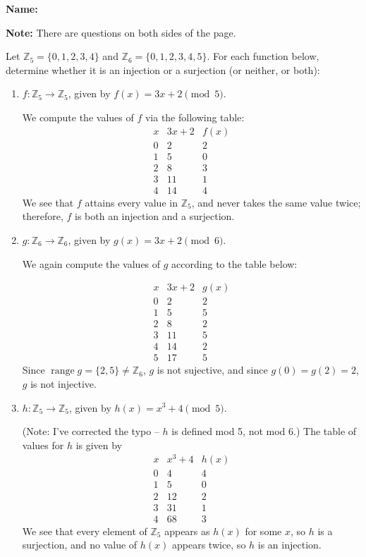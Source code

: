 \documentclass[12pt]{article}
\newcommand{\points}[1]{\marginpar{\hspace{24pt}[#1]}}
\newcommand{\Z}{\mathbb{Z}}
\begin{document}
{\bf Name:}
\thispagestyle{fancy}

\bigskip

{\bf Note:} There are questions on both sides of the page.

Let $\Z_5=\{0,1,2,3,4\}$ and $\Z_6 = \{0,1,2,3,4,5\}$. For each function below, determine whether it is an injection or a surjection (or neither, or both):
\begin{enumerate}
 \item $f:\Z_5\to\Z_5$, given by $f(x)=3x+2 \pmod{5}$. \points{3}

\bigskip

We compute the values of $f$ via the following table:
\[
 \begin{array}{c|c|c}
  x&3x+2&f(x)\\
\hline
  0&2&2\\
 1&5&0\\
 2&8&3\\
 3&11&1\\
 4&14&4
 \end{array}
\]
We see that $f$ attains every value in $\Z_5$, and never takes the same value twice; therefore, $f$ is both an injection and a surjection.

\bigskip

 \item $g:\Z_6\to \Z_6$, given by $g(x) = 3x+2 \pmod{6}$. \points{3}

\bigskip

We again compute the values of $g$ according to the table below:

\[
 \begin{array}{c|c|c}
  x&3x+2&g(x)\\
\hline
 0&2&2\\
 1&5&5\\
 2&8&2\\
 3&11&5\\
 4&14&2\\
 5&17&5
 \end{array}
\]
Since $\operatorname{range} g = \{2,5\}\neq \Z_6$, $g$ is not sujective, and since $g(0)=g(2)=2$, $g$ is not injective.

\newpage

 \item $h:\Z_5\to \Z_5$, given by $h(x) = x^3+4 \pmod{5}$. \points{3}

\bigskip

(Note: I've corrected the typo -- $h$ is defined mod 5, not mod 6.) The table of values for $h$ is given by
\[
 \begin{array}{c|c|c}
  x&x^3+4&h(x)\\
\hline
 0&4&4\\
 1&5&0\\
 2&12&2\\
 3&31&1\\
 4&68&3
 \end{array}
\]
We see that every element of $\Z_5$ appears as $h(x)$ for some $x$, so $h$ is a surjection, and no value of $h(x)$ appears twice, so $h$ is an injection.


\end{enumerate}
\end{document}

